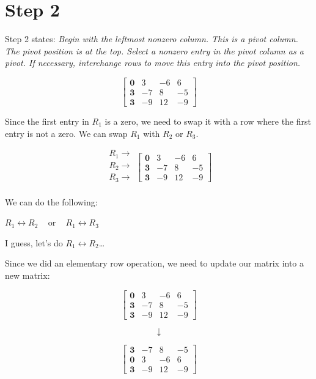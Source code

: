 \documentclass[
  letterpaper,
  DIV=11,
  numbers=noendperiod]{scrreprt}
\begin{document}
\chapter{Step 2}

Step 2 states: \emph{Begin with the leftmost nonzero column. This is a
pivot column. The pivot position is at the top. Select a nonzero entry
in the pivot column as a pivot. If necessary, interchange rows to move
this entry into the pivot position.}

\[
\begin{bmatrix}
    \mathbf{0} & 3 & -6 & 6 \\
    \mathbf{3} & -7 & 8 & -5 \\
    \mathbf{3} & -9 & 12 & -9
\end{bmatrix}
\]

Since the first entry in \(R_1\) is a zero, we need to swap it with a
row where the first entry is not a zero. We can swap \(R_1\) with
\(R_2\) or \(R_3\).

\[
\begin{array}{c}
     R_1 \rightarrow \\
     R_2 \rightarrow \\
     R_3 \rightarrow \\
\end{array}
\left[\begin{array}{ccc}
    \mathbf{0} & 3 & -6 & 6 \\
    \mathbf{3} & -7 & 8 & -5 \\
    \mathbf{3} & -9 & 12 & -9
\end{array}\right]
\]

We can do the following:

\(R_1 \leftrightarrow R_2 \;\;\;\) or \(\;\;\;R_1 \leftrightarrow R_3\)

I guess, let's do \(R_1 \leftrightarrow R_2\)\ldots{}

Since we did an elementary row operation, we need to update our matrix
into a new matrix:

\[
\begin{bmatrix}
    \mathbf{0} & 3 & -6 & 6 \\
    \mathbf{3} & -7 & 8 & -5 \\
    \mathbf{3} & -9 & 12 & -9
\end{bmatrix}
\]

\[
\downarrow
\]

\[
\begin{bmatrix}
    \mathbf{3} & -7 & 8 & -5  \\
    \mathbf{0} & 3 & -6 & 6   \\
    \mathbf{3} & -9 & 12 & -9
\end{bmatrix}
\]
\end{document}
